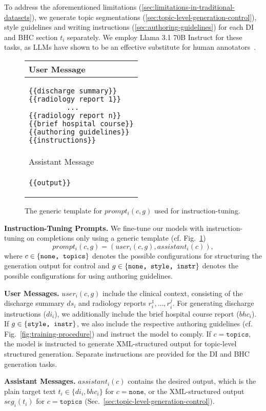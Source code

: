 To address the aforementioned limitations (\ref{sec:limitations-in-traditional-datasets}), we generate topic segmentations (\ref{sec:topic-level-generation-control}), style guidelines and writing instructions (\ref{sec:authoring-guidelines}) for each DI and BHC section $t_i$ separately. We employ Llama 3.1 70B Instruct for these tasks, as LLMs have shown to be an effective  substitute for human annotators~\citep{doi:10.1073/pnas.2305016120,perez-etal-2022-red}.


\begin{figure}[t!]
\centering
\begin{tabular}{p{}}
\hline
User Message \\
\hline
\vspace{-1em}
\begin{lstlisting}
{{discharge summary}}
{{radiology report 1}}
         ...
{{radiology report n}}
{{brief hospital course}}
{{authoring guidelines}}
{{instructions}}
\end{lstlisting} \vspace{-1.5em} \\
\hline
Assistant Message \\
\hline
\vspace{-1em}
\begin{lstlisting}
{{output}}
\end{lstlisting} \vspace{-1.5em} \\
\hline
\end{tabular}

\caption{The generic template for $prompt_i(c,g)$ used for instruction-tuning.}
\label{fig:prompt_template}
\end{figure}

\textbf{Instruction-Tuning Prompts.} 
We fine-tune our models with instruction-tuning on completions only using a generic template (cf. Fig.~\ref{fig:prompt_template}) $$prompt_i(c, g) = (user_i(c,g), assistant_i(c)),$$ where $c \in \{ \texttt{none,  \allowbreak topics} \}$ denotes the possible configurations for structuring the generation output for control and $g \in \{ \texttt{none, \allowbreak  style,  \allowbreak instr} \} $ denotes the possible configurations for using authoring guidelines.

\textbf{User Messages.} $user_i(c,g)$ include the clinical context, consisting of the discharge summary $ds_i$ and radiology reports $r_i^1, \dots, r_i^j$. For generating discharge instructions ($di_i$), we additionally include the brief hospital course report ($bhc_i$). If  $g \in \{ \texttt{style,  \allowbreak instr} \}$, we also include the respective authoring guidelines (cf. Fig.~\ref{fig:training-procedure}) and instruct the model to comply.
If $c = \texttt{topics}$,  the model is instructed to generate XML-structured output for topic-level structured generation.
Separate instructions are provided for the DI and BHC generation tasks.

\textbf{Assistant Messages.} $assistant_i(c)$ contains the desired output, which is the plain target text $t_i \in \{di_i, bhc_i\}$ for $c = \texttt{none}$, or the XML-structured output $seg_i(t_i)$ for $c = \texttt{topics}$ (Sec.~\ref{sec:topic-level-generation-control}).